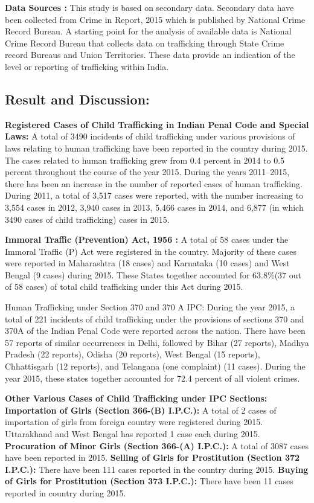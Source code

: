 \begin{multicols}{2}
\noi
\textbf{Data Sources :} This study is based on secondary data. Secondary data have been
collected from Crime in Report, 2015 which is published by National Crime Record
Bureau. A starting point for the analysis of available data is National Crime Record
Bureau that collects data on trafficking through State Crime record Bureaus and Union Territories. These data provide an indication of the level or reporting of trafficking
within India.

\subsection*{Result and Discussion:}

\noi
\textbf{Registered Cases of Child Trafficking in Indian Penal Code and Special Laws:} A
total of 3490 incidents of child trafficking under various provisions of laws relating to
human trafficking have been reported in the country during 2015. The cases related to
human trafficking grew from 0.4 percent in 2014 to 0.5 percent throughout the course
of the year 2015. During the years 2011–2015, there has been an increase in the number
of reported cases of human trafficking. During 2011, a total of 3,517 cases were
reported, with the number increasing to 3,554 cases in 2012, 3,940 cases in 2013, 5,466
cases in 2014, and 6,877 (in which 3490 cases of child trafficking) cases in 2015.

\noi
\textbf{Immoral Traffic (Prevention) Act, 1956 :} A total of 58 cases under the Immoral
Traffic (P) Act were registered in the country. Majority of these cases were reported in
Maharashtra (18 cases) and Karnataka (10 cases) and West Bengal (9 cases) during
2015. These States together accounted for 63.8\%(37 out of 58 cases) of total child
trafficking under this Act during 2015.

\noi
Human Trafficking under Section 370 and 370 A IPC: During the year 2015, a total of
221 incidents of child trafficking under the provisions of sections 370 and 370A of the
Indian Penal Code were reported across the nation. There have been 57 reports of
similar occurrences in Delhi, followed by Bihar (27 reports), Madhya Pradesh (22
reports), Odisha (20 reports), West Bengal (15 reports), Chhattisgarh (12 reports), and
Telangana (one complaint) (11 cases). During the year 2015, these states together
accounted for 72.4 percent of all violent crimes.

\noi
\textbf{Other Various Cases of Child Trafficking under IPC Sections: Importation of
Girls (Section 366-(B) I.P.C.):} A total of 2 cases of importation of girls from foreign
country were registered during 2015. Uttarakhand and West Bengal has reported 1 case
each during 2015. \textbf{Procuration of Minor Girls (Section 366-(A) I.P.C.):} A total of
3087 cases have been reported in 2015. \textbf{Selling of Girls for Prostitution (Section 372
I.P.C.):} There have been 111 cases reported in the country during 2015. \textbf{Buying of
Girls for Prostitution (Section 373 I.P.C.):} There have been 11 cases reported in
country during 2015.


\end{multicols}
